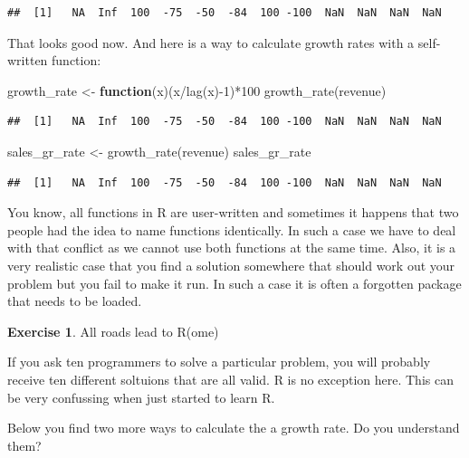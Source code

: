 \documentclass[
  12pt,
  oneside]{book}
\newenvironment{Shaded}{\begin{snugshade}}{\end{snugshade}}
\newcommand{\ControlFlowTok}[1]{\textcolor[rgb]{0.13,0.29,0.53}{\textbf{#1}}}
\newcommand{\DecValTok}[1]{\textcolor[rgb]{0.00,0.00,0.81}{#1}}
\newcommand{\FunctionTok}[1]{\textcolor[rgb]{0.00,0.00,0.00}{#1}}
\newcommand{\NormalTok}[1]{#1}
\newcommand{\OtherTok}[1]{\textcolor[rgb]{0.56,0.35,0.01}{#1}}
\newcommand{\SpecialCharTok}[1]{\textcolor[rgb]{0.00,0.00,0.00}{#1}}
\theoremstyle{definition}
\theoremstyle{definition}
\theoremstyle{definition}
\newtheorem{exercise}{Exercise}[chapter]
\theoremstyle{definition}
\theoremstyle{remark}
\begin{document}
\begin{verbatim}
##  [1]   NA  Inf  100  -75  -50  -84  100 -100  NaN  NaN  NaN  NaN
\end{verbatim}

That looks good now. And here is a way to calculate growth rates with a self-written function:

\begin{Shaded}
\begin{Highlighting}[]
\NormalTok{growth\_rate }\OtherTok{\textless{}{-}} \ControlFlowTok{function}\NormalTok{(x)(x}\SpecialCharTok{/}\FunctionTok{lag}\NormalTok{(x)}\SpecialCharTok{{-}}\DecValTok{1}\NormalTok{)}\SpecialCharTok{*}\DecValTok{100} 
\FunctionTok{growth\_rate}\NormalTok{(revenue)}
\end{Highlighting}
\end{Shaded}

\begin{verbatim}
##  [1]   NA  Inf  100  -75  -50  -84  100 -100  NaN  NaN  NaN  NaN
\end{verbatim}

\begin{Shaded}
\begin{Highlighting}[]
\NormalTok{sales\_gr\_rate }\OtherTok{\textless{}{-}} \FunctionTok{growth\_rate}\NormalTok{(revenue)}
\NormalTok{sales\_gr\_rate}
\end{Highlighting}
\end{Shaded}

\begin{verbatim}
##  [1]   NA  Inf  100  -75  -50  -84  100 -100  NaN  NaN  NaN  NaN
\end{verbatim}

You know, all functions in R are user-written and sometimes it happens that two people had the idea to name functions identically. In such a case we have to deal with that conflict as we cannot use both functions at the same time. Also, it is a very realistic case that you find a solution somewhere that should work out your problem but you fail to make it run. In such a case it is often a forgotten package that needs to be loaded.

\begin{exercise}
\protect\hypertarget{exr:growthrate}{}\label{exr:growthrate}All roads lead to R(ome)

If you ask ten programmers to solve a particular problem, you will probably receive ten different soltuions that are all valid. R is no exception here. This can be very confussing when just started to learn R.

Below you find two more ways to calculate the a growth rate. Do you understand them?
\end{exercise}
\end{document}
